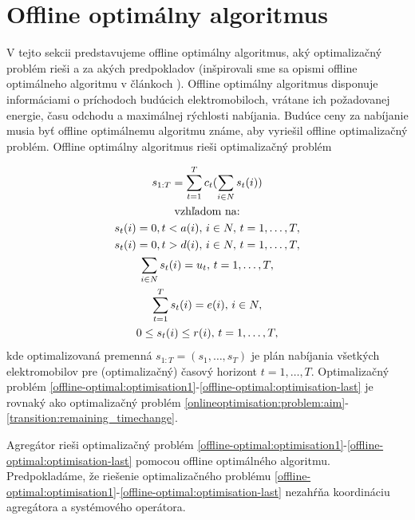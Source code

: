 \section{Offline optimálny algoritmus}
\label{offline:optimal}
V tejto sekcii predstavujeme offline optimálny algoritmus, aký optimalizačný problém rieši a za akých predpokladov (inšpirovali sme sa opismi offline optimálneho algoritmu v článkoch \cite{Li_2021,chen2021smoothed,offlineoptimal}). Offline optimálny algoritmus disponuje informáciami o príchodoch budúcich elektromobiloch, vrátane ich požadovanej energie, času odchodu a maximálnej rýchlosti nabíjania. Budúce ceny za nabíjanie musia byť offline optimálnemu algoritmu známe, aby vyriešil offline optimalizačný problém. Offline optimálny algoritmus rieši optimalizačný problém

\begin{gather}
    \label{offline-optimal:optimisation1}
    s_{1:T} = \sum_{t=1}^{T} c_{t}(\sum_{i \in N}s_{t}(i)) \\
    \notag
    \text{vzhľadom na:} \\
    s_{t}(i) = 0,t < a(i), \, i \in N, \, t = 1,\dots,T,  \\
    s_{t}(i) = 0,t > d(i), \, i \in N, \, t = 1,\dots,T, \\
    \sum_{i \in N} s_{t}(i) = u_{t}, \, t = 1, \dots, T,  \\
    \sum_{t=1}^{T} s_{t}(i) =  e(i), \, i \in N, \\
    \label{offline-optimal:optimisation-last}
    0 \leq s_{t}(i) \leq r(i), \, t = 1, \dots, T,
    \end{gather}
kde optimalizovaná premenná $s_{1:T} = (s_{1}, \dots, s_{T})$ je plán nabíjania všetkých elektromobilov pre (optimalizačný) časový horizont $t = 1,\dots, T$. Optimalizačný problém \eqref{offline-optimal:optimisation1}-\eqref{offline-optimal:optimisation-last} je rovnaký ako optimalizačný problém \eqref{onlineoptimisation:problem:aim}-\eqref{transition:remaining_timechange}.





Agregátor rieši optimalizačný problém \eqref{offline-optimal:optimisation1}-\eqref{offline-optimal:optimisation-last} pomocou offline optimálného algoritmu. Predpokladáme, že riešenie  optimalizačného problému  \eqref{offline-optimal:optimisation1}-\eqref{offline-optimal:optimisation-last} nezahŕňa koordináciu agregátora a systémového operátora. 

